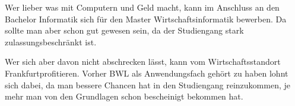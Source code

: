 Wer lieber was mit Computern und Geld macht, kann im Anschluss an den Bachelor Informatik sich f\"ur den Master Wirtschaftsinformatik bewerben. Da sollte man aber schon gut gewesen sein, da der Studiengang stark zulassungsbeschr\"ankt ist.

Wer sich aber davon nicht abschrecken l\"asst, kann vom \glqq{ }Wirtschaftsstandort Frankfurt\texttrademark{ }profitieren\texttrademark\grqq{}.
Vorher BWL als Anwendungsfach geh\"ort zu haben lohnt sich dabei, da man bessere Chancen hat in den Studiengang reinzukommen,
je mehr man von den Grundlagen schon bescheinigt bekommen hat.
